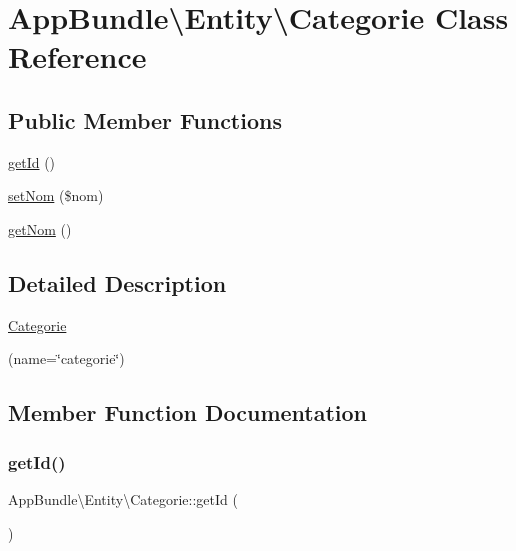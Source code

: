 \hypertarget{class_app_bundle_1_1_entity_1_1_categorie}{}\section{App\+Bundle\textbackslash{}Entity\textbackslash{}Categorie Class Reference}
\label{class_app_bundle_1_1_entity_1_1_categorie}
\subsection*{Public Member Functions}
\begin{DoxyCompactItemize}
\item 
\hyperlink{class_app_bundle_1_1_entity_1_1_categorie_a661c70c104716799623255c3e60f572f}{get\+Id} ()
\item 
\hyperlink{class_app_bundle_1_1_entity_1_1_categorie_a911c06661cd6a47473f0297a3543b83b}{set\+Nom} (\$nom)
\item 
\hyperlink{class_app_bundle_1_1_entity_1_1_categorie_aeae7080141a8c413f24c450c3c33816e}{get\+Nom} ()
\end{DoxyCompactItemize}


\subsection{Detailed Description}
\hyperlink{class_app_bundle_1_1_entity_1_1_categorie}{Categorie}

(name=\char`\"{}categorie\char`\"{})  

\subsection{Member Function Documentation}
\mbox{\label{class_app_bundle_1_1_entity_1_1_categorie_a661c70c104716799623255c3e60f572f}} 
\subsubsection{\texorpdfstring{get\+Id()}{getId()}}
{\footnotesize\ttfamily App\+Bundle\textbackslash{}\+Entity\textbackslash{}\+Categorie\+::get\+Id (\begin{DoxyParamCaption}{ }\end{DoxyParamCaption})}

